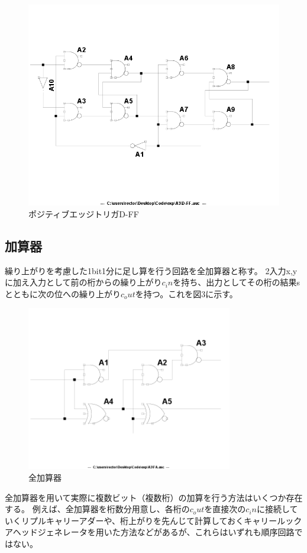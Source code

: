 \documentclass[10pt,a4j,dvipdfmx]{jsarticle}
\makeatletter
\let\@oldsubsec\subsection
\renewcommand{\subsection}[1]{\vspace{-7pt}\@oldsubsec{#1}}
\makeatother
\begin{document}
\begin{figure}[H]
       \centering
       \includegraphics[width=12cm]{D-FF.png}
       \caption{ポジティブエッジトリガD-FF}
\end{figure}

\subsection{加算器}
繰り上がりを考慮した1bit1分に足し算を行う回路を全加算器と称す。
2入力x,yに加え入力として前の桁からの繰り上がり$c_in$を持ち、出力としてその桁の結果sとともに次の位への繰り上がり$c_out$を持つ。これを図3に示す。

\begin{figure}[H]
       \centering
       \includegraphics[width=9cm]{FA.png}
       \caption{全加算器}
\end{figure}


全加算器を用いて実際に複数ビット（複数桁）の加算を行う方法はいくつか存在する。
例えば、全加算器を桁数分用意し、各桁の$c_out$を直接次の$c_in$に接続していくリプルキャリーアダーや、桁上がりを先んじて計算しておくキャリールックアヘッドジェネレータを用いた方法などがあるが、これらはいずれも順序回路ではない。
\end{document}
